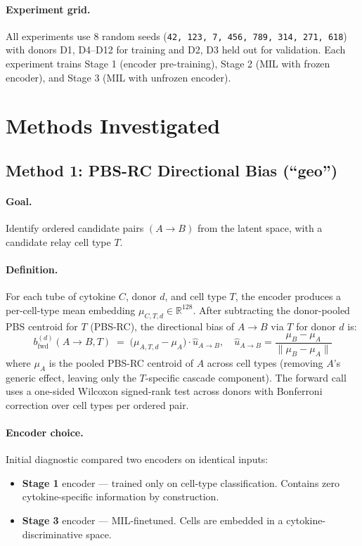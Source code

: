 \documentclass[11pt,a4paper]{article}
\newcommand{\codeword}[1]{\texttt{\small #1}}
\begin{document}
\paragraph{Experiment grid.}
All experiments use 8 random seeds
(\codeword{42, 123, 7, 456, 789, 314, 271, 618}) with donors D1, D4--D12
for training and D2, D3 held out for validation. Each experiment trains
Stage 1 (encoder pre-training), Stage 2 (MIL with frozen encoder), and
Stage 3 (MIL with unfrozen encoder).

\section{Methods Investigated}

\subsection{Method 1: PBS-RC Directional Bias (``geo'')}

\paragraph{Goal.} Identify ordered candidate pairs $(A \to B)$ from the
latent space, with a candidate relay cell type $T$.

\paragraph{Definition.} For each tube of cytokine $C$, donor $d$, and
cell type $T$, the encoder produces a per-cell-type mean embedding
$\mu_{C,T,d} \in \mathbb{R}^{128}$. After subtracting the donor-pooled PBS
centroid for $T$ (PBS-RC), the directional bias of $A \to B$ via $T$
for donor $d$ is:
\[
b_{\mathrm{fwd}}^{(d)}(A \to B, T)
\;=\;
\bigl(\mu_{A,T,d} - \mu_A\bigr) \cdot \hat{u}_{A \to B},
\quad
\hat{u}_{A \to B} = \frac{\mu_B - \mu_A}{\|\mu_B - \mu_A\|}
\]
where $\mu_A$ is the pooled PBS-RC centroid of $A$ across cell types
(removing $A$'s generic effect, leaving only the $T$-specific cascade
component). The forward call uses a one-sided Wilcoxon signed-rank test
across donors with Bonferroni correction over cell types per ordered pair.

\paragraph{Encoder choice.} Initial diagnostic compared two encoders on
identical inputs:
\begin{itemize}
\item \textbf{Stage 1} encoder --- trained only on cell-type classification.
  Contains zero cytokine-specific information by construction.
\item \textbf{Stage 3} encoder --- MIL-finetuned. Cells are embedded in a
  cytokine-discriminative space.
\end{itemize}
\end{document}

